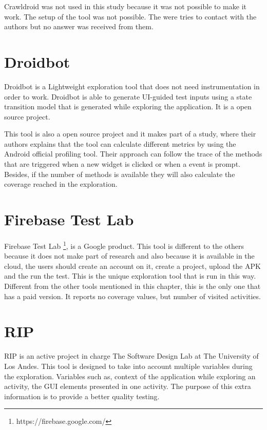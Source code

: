 Crawldroid was not used in this study because it was not possible to make it work. The setup of the tool was not possible. The were tries to contact with the authors but no answer was received from them.

\section{Droidbot}\label{sec:droidbot}
Droidbot \cite{droidbot} is a Lightweight exploration tool that does not need instrumentation in order to work. Droidbot is able to generate UI-guided test inputs using a state transition model that is generated while exploring the application. It is a open source project.

This tool is also a open source project and it makes part of a study, where their authors explains that the tool can calculate different metrics by using the Android official profiling tool. Their approach can follow the trace of the methods that are triggered when a new widget is clicked or when a event is prompt. Besides, if the number of methods is available they will also calculate the coverage reached in the exploration.

\section{Firebase Test Lab}\label{sec:testlab}

Firebase Test Lab \footnote{https://firebase.google.com/}, is a Google product. This tool is different to the others because it does not make part of research and also because it is available in the cloud, the users should create an account on it, create a project, upload the APK and the run the test. This is the unique exploration tool that is run in this way. Different from the other tools mentioned in this chapter, this is the only one that has a paid version. It reports no coverage values, but number of visited activities.

\section{RIP}\label{sec:rip}
RIP \cite{Liñán} is an active project in charge The Software Design Lab at The University of Los Andes. This tool is designed to take into account multiple variables during the exploration. Variables such as, context of the application while exploring an activity, the GUI elements presented in one activity. The purpose of this extra information is to provide a better quality testing.

